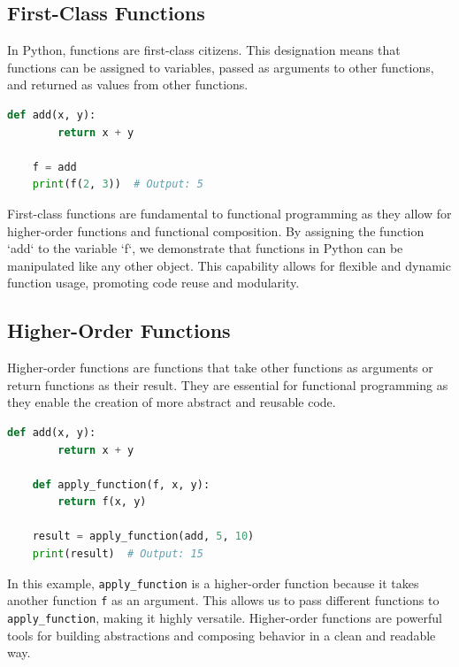 \documentclass[a4paper]{article}
\begin{document}
\subsection{First-Class Functions}
In Python, functions are first-class citizens. This designation means that functions can be assigned to variables, passed as arguments to other functions, and returned as values from other functions.\\

\begin{lstlisting}[language=Python, caption=First-Class Functions]
    def add(x, y):
        return x + y

    f = add
    print(f(2, 3))  # Output: 5
\end{lstlisting}

First-class functions are fundamental to functional programming as they allow for higher-order functions and functional composition. By assigning the function `add` to the variable `f`, we demonstrate that functions in Python can be manipulated like any other object. This capability allows for flexible and dynamic function usage, promoting code reuse and modularity.\\

\subsection{Higher-Order Functions}
Higher-order functions are functions that take other functions as arguments or return functions as their result. They are essential for functional programming as they enable the creation of more abstract and reusable code.\\

\begin{lstlisting}[language=Python, caption=Higher-Order Functions]
    def add(x, y):
        return x + y

    def apply_function(f, x, y):
        return f(x, y)

    result = apply_function(add, 5, 10)
    print(result)  # Output: 15
\end{lstlisting}

In this example, \texttt{apply\_function} is a higher-order function because it takes another function \texttt{f} as an argument. This allows us to pass different functions to \texttt{apply\_function}, making it highly versatile. Higher-order functions are powerful tools for building abstractions and composing behavior in a clean and readable way.\\
\end{document}
